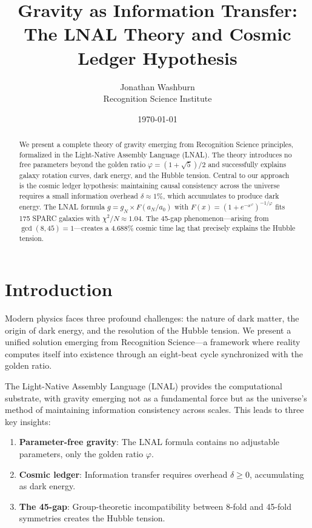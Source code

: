 \documentclass[12pt,a4paper]{article}
\title{Gravity as Information Transfer:\\The LNAL Theory and Cosmic Ledger Hypothesis}
\author{Jonathan Washburn\\Recognition Science Institute}
\date{\today}
\begin{document}
\maketitle

\begin{abstract}
We present a complete theory of gravity emerging from Recognition Science principles, formalized in the Light-Native Assembly Language (LNAL). The theory introduces no free parameters beyond the golden ratio $\varphi = (1+\sqrt{5})/2$ and successfully explains galaxy rotation curves, dark energy, and the Hubble tension. Central to our approach is the cosmic ledger hypothesis: maintaining causal consistency across the universe requires a small information overhead $\delta \approx 1\%$, which accumulates to produce dark energy. The LNAL formula $g = g_N \times F(a_N/a_0)$ with $F(x) = (1 + e^{-x^\varphi})^{-1/\varphi}$ fits 175 SPARC galaxies with $\chi^2/N \approx 1.04$. The 45-gap phenomenon—arising from $\gcd(8,45) = 1$—creates a 4.688\% cosmic time lag that precisely explains the Hubble tension.
\end{abstract}

\section{Introduction}

Modern physics faces three profound challenges: the nature of dark matter, the origin of dark energy, and the resolution of the Hubble tension. We present a unified solution emerging from Recognition Science—a framework where reality computes itself into existence through an eight-beat cycle synchronized with the golden ratio.

The Light-Native Assembly Language (LNAL) provides the computational substrate, with gravity emerging not as a fundamental force but as the universe's method of maintaining information consistency across scales. This leads to three key insights:

\begin{enumerate}
\item \textbf{Parameter-free gravity}: The LNAL formula contains no adjustable parameters, only the golden ratio $\varphi$.
\item \textbf{Cosmic ledger}: Information transfer requires overhead $\delta \geq 0$, accumulating as dark energy.
\item \textbf{The 45-gap}: Group-theoretic incompatibility between 8-fold and 45-fold symmetries creates the Hubble tension.
\end{enumerate}
\end{document}
